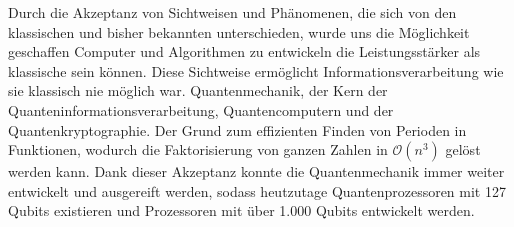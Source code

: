 Durch die Akzeptanz von Sichtweisen und Ph\"anomenen, die sich von den klassischen und bisher bekannten unterschieden, wurde uns die M\"oglichkeit geschaffen Computer und Algorithmen zu entwickeln die Leistungsst\"arker als klassische sein k\"onnen. Diese Sichtweise erm\"oglicht Informationsverarbeitung wie sie klassisch nie m\"oglich war. Quantenmechanik, der Kern der Quanteninformationsverarbeitung, Quantencomputern und der Quantenkryptographie. Der Grund zum effizienten Finden von Perioden in Funktionen, wodurch die Faktorisierung von ganzen Zahlen in $\mathcal{O}(n^3)$ gel\"ost werden kann. Dank dieser Akzeptanz konnte die Quantenmechanik immer weiter entwickelt und ausgereift werden, sodass heutzutage Quantenprozessoren mit 127 Qubits existieren und Prozessoren mit \"uber 1.000 Qubits entwickelt werden. 
